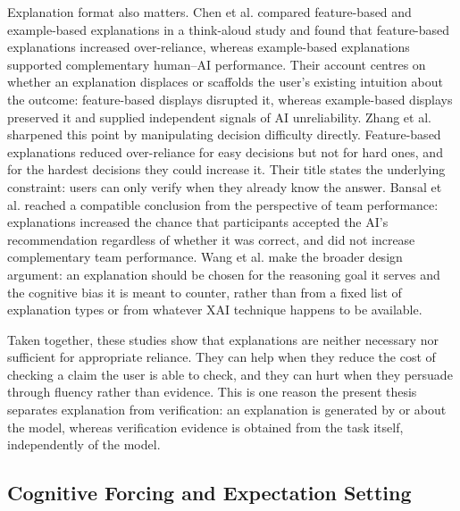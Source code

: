 \documentclass[oneside,final,14pt,a4paper]{extreport}
\begin{document}
Explanation format also matters. Chen et al. \cite{Chen2023} compared
feature-based and example-based explanations in a think-aloud study and found
that feature-based explanations increased over-reliance, whereas example-based
explanations supported complementary human--AI performance. Their account
centres on whether an explanation displaces or scaffolds the user's existing
intuition about the outcome: feature-based displays disrupted it, whereas
example-based displays preserved it and supplied independent signals of AI
unreliability. Zhang et al. \cite{Zhang2024Verify} sharpened this point by
manipulating decision difficulty directly. Feature-based explanations reduced
over-reliance for easy decisions but not for hard ones, and for the hardest
decisions they could increase it.
Their title states the underlying constraint: users can only verify when they
already know the answer. Bansal et al. \cite{Bansal2021} reached a compatible
conclusion from the perspective of team performance: explanations increased the
chance that participants accepted the AI's recommendation regardless of whether
it was correct, and did not increase complementary team performance. Wang et
al. \cite{Wang2019} make the broader design argument: an explanation should be
chosen for the reasoning goal it serves and the cognitive bias it is meant to
counter, rather than from a fixed list of explanation types or from whatever
XAI technique happens to be available.

Taken together, these studies show that explanations are neither necessary nor
sufficient for appropriate reliance. They can help when they reduce the cost of
checking a claim the user is able to check, and they can hurt when they persuade
through fluency rather than evidence. This is one reason the present thesis
separates explanation from verification: an explanation is generated by or
about the model, whereas verification evidence is obtained from the task
itself, independently of the model.

\subsection{Cognitive Forcing and Expectation Setting}
\label{sec:lit-forcing}
\end{document}
